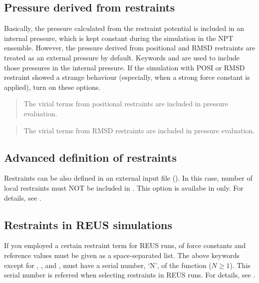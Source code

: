 \documentclass[a4paper,11pt,oneside,english]{sphinxmanual}
\begin{document}
\subsection{Pressure derived from restraints}
\label{\detokenize{12_Restraints:pressure-derived-from-restraints}}
Basically, the pressure calculated from the restraint potential is included
in an internal pressure, which is kept constant during the simulation in the NPT ensemble.
However, the pressure derived from positional and RMSD restraints are treated as an external pressure by default.
Keywords  and  are used to include those pressures in the internal pressure.
If the simulation with POSI or RMSD restraint showed a strange behaviour
(especially, when a strong force constant is applied), turn on these options.

 
\begin{quote}


The virial terms from positional restraints are included in pressure evaluation.
\end{quote}

 
\begin{quote}


The virial terms from RMSD restraints are included in pressure evaluation.
\end{quote}


\subsection{Advanced definition of restraints}
\label{\detokenize{12_Restraints:advanced-definition-of-restraints}}
Restraints can be also defined in an external input file ().
In this case, number of local restraints must NOT be included in .
This option is availabe in  only.
For details, see {\hyperref[\detokenize{03_Input:input}]{}}.


\subsection{Restraints in REUS simulations}
\label{\detokenize{12_Restraints:restraints-in-reus-simulations}}
If you employed a certain restraint term for REUS runs, 
of force constants and reference values must be given as a space-separated list.
The above keywords except for , ,
and , must have a serial number,
‘N’, of the function (\(N \geq 1\)).
This serial number is referred when selecting restraints in REUS runs.
For details, see {\hyperref[\detokenize{14_REMD:remd}]{}}.
\end{document}
